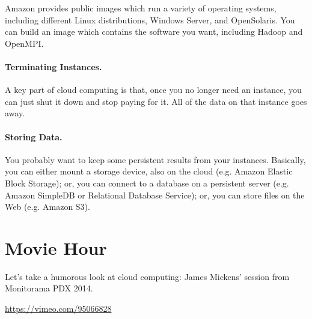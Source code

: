 Amazon provides public images which run a variety of operating
systems, including different Linux distributions, Windows Server, and
OpenSolaris. You can build an image which contains the software you
want, including Hadoop and OpenMPI.

\paragraph{Terminating Instances.} A key part of cloud computing is
that, once you no longer need an instance, you can just shut it down
and stop paying for it. All of the data on that instance goes away.

\paragraph{Storing Data.} You probably want to keep some persistent results
from your instances. Basically, you can either mount a storage device,
also on the cloud (e.g. Amazon Elastic Block Storage); or, you can
connect to a database on a persistent server (e.g. Amazon SimpleDB or
Relational Database Service); or, you can store files on the Web
(e.g. Amazon S3). 

\section*{Movie Hour}
Let's take a humorous look at cloud computing: James Mickens' session from Monitorama PDX 2014. 

\begin{center}
\url{https://vimeo.com/95066828}
\end{center}




